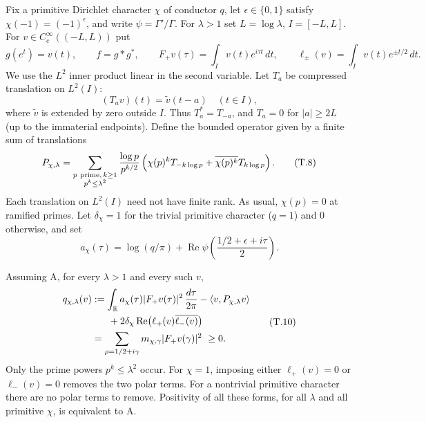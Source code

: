 Fix a primitive Dirichlet character \(\chi\) of conductor \(q\),
let \(\epsilon\in\{0,1\}\) satisfy \(\chi(-1)=(-1)^\epsilon\),
and write \(\psi=\Gamma'/\Gamma\).
For \(\lambda>1\) set \(L=\log\lambda\), \(I=[-L,L]\).
For \(v\in C_c^\infty((-L,L))\) put
\[
 g(e^t)=v(t),\qquad
 f=g*g^*,\qquad
 F_+v(\tau)=\int_I v(t)e^{i\tau t}\,dt,\qquad
 \ell_\pm(v)=\int_I v(t)e^{\pm t/2}\,dt .
\]
We use the \(L^2\) inner product linear in the second variable.
Let \(T_a\) be compressed translation on \(L^2(I)\):
\[
 (T_a v)(t)=\widetilde v(t-a)\quad(t\in I),
\]
where \(\widetilde v\) is extended by zero outside \(I\).
Thus \(T_a^*=T_{-a}\), and \(T_a=0\) for \(|a|\geq2L\)
(up to the immaterial endpoints). Define the bounded
operator given by a finite sum of translations
\[
 P_{\chi,\lambda}=
 \sum_{\substack{p\ {\rm prime},\,k\geq1\\p^k\leq\lambda^2}}
 \frac{\log p}{p^{k/2}}
 \left(\chi(p)^k T_{-k\log p}
       +\overline{\chi(p)^k}T_{k\log p}\right).                 \tag{T.8}
\]
Each translation on \(L^2(I)\) need not have finite rank.
As usual, \(\chi(p)=0\) at ramified primes.
Let \(\delta_\chi=1\) for the trivial primitive character
(\(q=1\)) and \(0\) otherwise, and set
\[
 a_\chi(\tau)=
 \log(q/\pi)+
 \operatorname{Re}\psi\!\left(\frac{1/2+\epsilon+i\tau}{2}\right).
                                                               \tag{T.9}
\]

\begin{theorem}
\label{AC-T05}
Assuming A, for every \(\lambda>1\) and every such \(v\),
\[
\begin{split}
 q_{\chi,\lambda}(v)
 &:=
 \int_{\mathbb R}a_\chi(\tau)|F_+v(\tau)|^2\,
                    \frac{d\tau}{2\pi}
 -\langle v,P_{\chi,\lambda}v\rangle\\
 &\hspace{6mm}
 +2\delta_\chi\operatorname{Re}
            \bigl(\ell_+(v)\overline{\ell_-(v)}\bigr)\\
 &=\sum_{\rho=1/2+i\gamma}
               m_{\chi,\gamma}|F_+v(\gamma)|^2\ \geq0 .
\end{split}\tag{T.10}
\]
Only the prime powers \(p^k\leq\lambda^2\) occur.
For \(\chi=1\), imposing either \(\ell_+(v)=0\) or
\(\ell_-(v)=0\) removes the two polar terms. For a nontrivial
primitive character there are no polar terms to remove.
Positivity of all these forms, for all \(\lambda\) and all
primitive \(\chi\), is equivalent to A.
\end{theorem}

